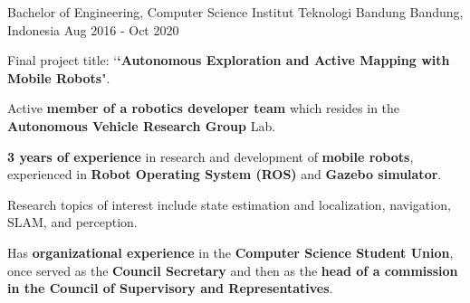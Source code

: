 

\begin{cventries}

  \cventry
    {Bachelor of Engineering, Computer Science} %
    {Institut Teknologi Bandung} %
    {Bandung, Indonesia} %
    {Aug 2016 - Oct 2020} %
    {
   	  \begin{cvitems}
		  \item {Final project title: `\textbf{`Autonomous Exploration and Active Mapping with Mobile Robots}".}
		  \item {Active \textbf{member of a robotics developer team} which resides in the \textbf{Autonomous Vehicle Research Group} Lab.}
		  \item {\textbf{3 years of experience} in research and development of \textbf{mobile robots}, experienced in \textbf{Robot Operating System (ROS)} and \textbf{Gazebo simulator}.}
          \item {Research topics of interest include state estimation and localization, navigation, SLAM, and perception.}
          \item {Has \textbf{organizational experience} in the \textbf{Computer Science Student Union}, once served as the \textbf{Council Secretary} and then as the \textbf{head of a commission in the Council of Supervisory and Representatives}.}
   	  \end{cvitems}
    }

\end{cventries}
